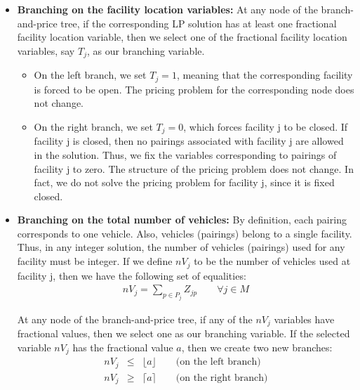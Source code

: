 \begin {itemize}
\item [{\bf Rule 1}]

{\bf Branching on the facility location variables:} At any node of the branch-and-price tree, 
if the corresponding LP solution has at least one fractional facility location variable, then
we select one of the fractional facility location variables, say $T_j$, as our branching
variable. 
\begin {itemize}
\item On the left branch, we set $T_j=1$, meaning that the corresponding facility is forced 
  to be open. The pricing problem for the corresponding node does not change.
\item On the right branch, we set $T_j=0$, which forces facility j to be closed. 
  If facility j is closed, then no pairings associated with facility j are allowed in the 
  solution. Thus, we fix the variables corresponding to pairings of facility j to zero. The structure 
  of the pricing problem does not change. In fact, we do not solve the pricing problem for facility j, 
  since it is fixed closed.
\end{itemize}

\item [{\bf Rule 2}]

  {\bf Branching on the total number of vehicles:} By definition, each pairing 
  corresponds to one vehicle. Also, vehicles (pairings) belong to a single facility. Thus, in 
  any integer solution, the number of vehicles (pairings) used for any facility must be integer. 
  If we define $nV_j$ to be the number of vehicles used at facility j, then we have the following 
  set of equalities: 
  \begin{eqnarray}
    \label{n-equal}
   nV_j =\sum_{p \in P_j} Z_{jp} \qquad \forall j \in M 
  \end{eqnarray}      
  

  At any node of the branch-and-price tree, if any of the $nV_j$ variables have fractional values, then 
  we select   one as our branching variable. If the selected variable $nV_j$ has the fractional value 
  $a$, then  we create two new branches:
  \begin{eqnarray*}
   nV_j & \leq & \lfloor a \rfloor \qquad  \mbox {(on the left branch)}\\
   nV_j & \geq & \lceil a \rceil    \qquad \mbox {(on the right branch)}
  \end{eqnarray*}    
  

\end{itemize}
